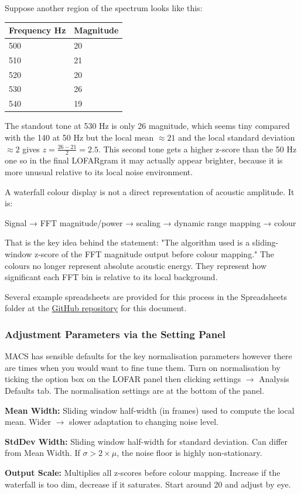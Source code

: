 Suppose another region of the spectrum looks like this:

\begin{tabular}{ll}
    Frequency Hz & Magnitude \\
    \hline
    500	& 20 \\
    510	& 21 \\
    520	& 20 \\
    530	& 26 \\
    540	& 19
\end{tabular}

The standout tone at 530 Hz is only 26 magnitude, which seems tiny compared with the 140 at 50 Hz but the local mean $\approx 21$ and the local standard deviation $\approx 2$ gives $z = \frac{26-21}{2} = 2.5$. This second tone gets a higher z-score than the 50 Hz one so in the final LOFARgram it may actually appear brighter, because it is more unusual relative to its local noise environment.

A waterfall colour display is not a direct representation of acoustic amplitude. It is:

Signal → FFT magnitude/power → scaling → dynamic range mapping → colour

\begin{faintquote}
    That is the key idea behind the statement: "The algorithm used is a sliding-window z-score of the FFT magnitude output before colour mapping." The colours no longer represent absolute acoustic energy. They represent how significant each FFT bin is relative to its local background.
\end{faintquote}

Several example spreadsheets are provided for this process in the Spreadsheets folder at the \href{https://github.com/nbowling/MACS_Guide_Working}{GitHub repository} for this document.

\subsubsection{Adjustment Parameters via the Setting Panel}

MACS has sensible defaults for the key normalisation parameters however there are times when you would want to fine tune them. Turn on normalisation by ticking the option box on the LOFAR panel then clicking settings $\rightarrow$ Analysis Defaults tab. The normalisation settings are at the bottom of the panel.

\begin{compactenum}
    \item \textbf{Mean Width:} Sliding window half-width (in frames) used to compute the local mean. Wider $\rightarrow$ slower adaptation to changing noise level.
    \item \textbf{StdDev Width:} Sliding window half-width for standard deviation. Can differ from Mean Width. If $\sigma > 2  \times \mu$, the noise floor is highly non-stationary.
    \item \textbf{Output Scale:} Multiplies all z-scores before colour mapping. Increase if the waterfall is too dim, decrease if it saturates. Start around 20 and adjust by eye.
\end{compactenum}

